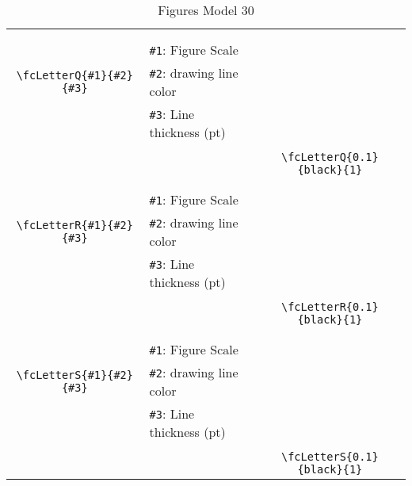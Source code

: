 \documentclass[x11names]{article}
\begin{document}
\begin{table}[H]
\begin{tabular}{|c|l|c|}
	&&\multirow{5}{*}{\fcLetterQ{0.1}{black}{1}}\\	&&\\	&\verb|#1|: Figure Scale &\\	\verb|\fcLetterQ{#1}{#2}{#3}|&	\verb|#2|: drawing line color &\\	&\verb|#3|: Line thickness (pt) &\\ &&\\&&	\verb|\fcLetterQ{0.1}{black}{1}|\\\hline 	
	&&\multirow{5}{*}{\fcLetterR{0.1}{black}{1}}\\	&&\\	&\verb|#1|: Figure Scale &\\	\verb|\fcLetterR{#1}{#2}{#3}|&	\verb|#2|: drawing line color &\\	&\verb|#3|: Line thickness (pt) &\\ &&\\&&	\verb|\fcLetterR{0.1}{black}{1}|\\\hline 	
	&&\multirow{5}{*}{\fcLetterS{0.1}{black}{1}}\\	&&\\	&\verb|#1|: Figure Scale &\\	\verb|\fcLetterS{#1}{#2}{#3}|&	\verb|#2|: drawing line color &\\	&\verb|#3|: Line thickness (pt) &\\ &&\\&&	\verb|\fcLetterS{0.1}{black}{1}|\\\hline 	\hline\end{tabular}\caption{Figures Model 30}\label{tab30}\end{table}
\end{document}
